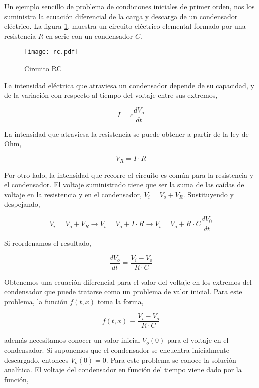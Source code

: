 Un ejemplo sencillo de problema de condiciones iniciales de primer orden, nos los suministra la ecuación diferencial de la carga y descarga de un condensador eléctrico. La figura \ref{fig:RC}, muestra un circuito eléctrico elemental formado por una resistencia $R$ en serie con un condensador $C$. 

\begin{figure}[h]
\centering
\texttt{[image: rc.pdf]}
\caption{Circuito RC}
\label{fig:RC}
\end{figure}

La intensidad eléctrica que atraviesa un condensador depende de su capacidad, y de la variación con respecto al tiempo del voltaje entre sus extremos,

\begin{equation*}
I=c\frac{dV_o}{dt}
\end{equation*}

La intensidad que atraviesa la resistencia se puede obtener a partir de la ley de Ohm,

\begin{equation*}
V_R=I\cdot R
\end{equation*}

Por otro lado, la intensidad que recorre el circuito es común para la resistencia y el condensador. El voltaje suministrado tiene que ser la suma de las caídas de voltaje en la resistencia y en el condensador, $V_i=V_o+V_R$. Sustituyendo y despejando,

\begin{equation*}
V_i=V_o+V_R \rightarrow V_i=V_o+I\cdot R \rightarrow V_i=V_o+R\cdot C\frac{dV_0}{dt}
\end{equation*}

Si reordenamos el resultado, 

\begin{equation*}
\frac{dV_o}{dt}=\frac{V_i-V_o}{R \cdot C}
\end{equation*}

Obtenemos una ecuación diferencial para el valor del voltaje en los extremos del condensador que puede tratarse como un  problema de valor inicial. Para este problema, la función $f(t,x)$ toma la forma,

\begin{equation*}
f(t,x) \equiv \frac{V_i-V_o}{R \cdot C}
\end{equation*}

además necesitamos conocer un valor inicial $V_o(0)$ para el voltaje en el condensador. Si suponemos que el condensador se encuentra inicialmente descargado, entonces $V_o(0)=0$. Para este problema se conoce la solución analítica. El voltaje del condensador en función del tiempo viene dado por la función,

